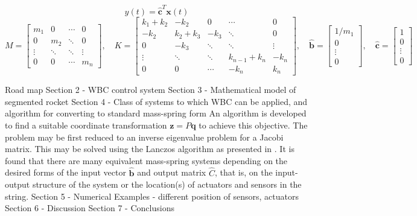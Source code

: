 \documentclass{mbd_fullpaper}
\begin{document}
\begin{equation}
y(t) = \mathbf{\hat{c}}^T \mathbf{x}(t)
\label{eq:eom2}
\end{equation}
\begin{equation}
M = \begin{bmatrix}
m_1  &  0 & \cdots & 0 \\
0 & m_2  & \ddots & 0 \\
\vdots & \ddots & \ddots & \vdots \\
0 & 0 & \cdots & m_n \end{bmatrix}
, \quad
K = \begin{bmatrix}
k_1+k_2  &  -k_2 & 0 & \cdots & 0 \\
-k_2 & k_2+k_3  & -k_3 & \ddots & 0 \\
0 & -k_3 & \ddots & \ddots & \vdots \\
\vdots & \ddots & \ddots & k_{n-1}+k_n & -k_{n} \\
0 & 0 & \cdots & -k_{n} & k_n \end{bmatrix}
,\quad \mathbf{\hat{b}} = \begin{bmatrix} {1}/{m_1} \\ 0 \\ \vdots \\ 0 \end{bmatrix}
,\quad \mathbf{\hat{c}} = \begin{bmatrix} 1 \\ 0 \\ \vdots \\ 0 \end{bmatrix}
\end{equation}

Road map
Section 2 - WBC control system
Section 3 - Mathematical model of segmented rocket
Section 4 - Class of systems to which WBC can be applied, and algorithm for converting to standard mass-spring form
An algorithm is developed to find a suitable coordinate transformation $\mathbf{z} = P \mathbf{q}$ to achieve this objective.
The problem may be first reduced to an inverse eigenvalue problem for a Jacobi matrix. This may be solved using the Lanczos algorithm as presented in \cite{gladwell1986inverse}. 
It is found that there are many equivalent mass-spring systems depending on the desired forms of the input vector $\hat{\mathbf{b}}$ and output matrix $\hat{C}$, that is, on the input-output structure of the system or the location(s) of actuators and sensors in the string.
Section 5 - Numerical Examples - different position of sensors, actuators
Section 6 - Discussion
Section 7 - Conclusions 
\end{document}
